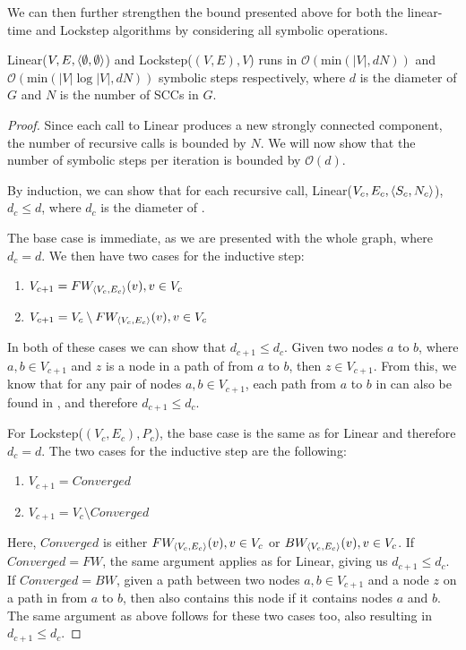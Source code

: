 \documentclass[../master/master.tex]{subfiles}
\begin{document}
We can then further strengthen the bound presented above for both the linear-time and Lockstep algorithms by considering all symbolic operations.
\begin{theorem}\label{magic} Linear($V, E, \pair{\emptyset}{\emptyset}$) and Lockstep($(V, E), V$) runs in $\mathcal{O}(\text{min}(|V|, dN))$ and $\mathcal{O}(\text{min}(|V|\log|V|, dN))$ symbolic steps respectively, where $d$ is the diameter of $G$ and $N$ is the number of SCCs in $G$.\end{theorem}
\begin{proof}
  Since each call to Linear produces a new strongly connected component, the number of recursive calls is bounded by $N$. We will now show that the number of symbolic steps per iteration is bounded by $\mathcal{O}(d)$.

  By induction, we can show that for each recursive call, Linear($V_c, E_c, \pair{S_c}{N_c}$), $d_c\leq d$, where $d_c$ is the diameter of .
  
  The base case is immediate, as we are presented with the whole graph, where $d_c=d$. We then have two cases for the inductive step:
  \begin{enumerate}
  \item $V_{c+1} = \FW[\pair{V_c}{E_c}]{v}, v\in V_c$
  \item  $V_{c+1} = V_c\setminus\FW[\pair{V_c}{E_c}]{v}, v\in V_c$
  \end{enumerate}

  In both of these cases we can show that $d_{c+1}\leq d_c$. Given two nodes $a$ to $b$, where $a, b \in V_{c+1}$ and $z$ is a node in a path of  from $a$ to $b$, then $z\in V_{c+1}$. From this, we know that for any pair of nodes $a, b\in V_{c+1}$, each path from $a$ to $b$ in  can also be found in , and therefore $d_{c+1}\leq d_c$.
  
  For Lockstep($(V_c, E_c), P_c$), the base case is the same as for Linear and therefore $d_c=d$. The two cases for the inductive step are the following:
  \begin{enumerate}
  \item $V_{c+1} = Converged$
  \item  $V_{c+1} = V_c\setminus Converged$
  \end{enumerate}
  
  Here, $Converged$ is either $\FW[\pair{V_c}{E_c}]{v}, v\in V_c$ or $\BW[\pair{V_c}{E_c}]{v}, v\in V_c$. If $Converged = FW$, the same argument applies as for Linear, giving us $d_{c+1}\leq d_c$. If $Converged=BW$, given a path between two nodes $a, b \in V_{c+1}$ and a node $z$ on a path in  from $a$ to $b$, then  also contains this node if it contains nodes $a$ and $b$. The same argument as above follows for these two cases too, also resulting in $d_{c+1}\leq d_c$. 
  

\end{proof}
\end{document}
